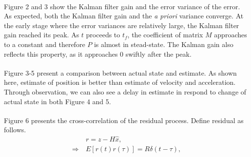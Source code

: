 \paragraph{}
Figure 2 and 3 show the Kalman filter gain and the error variance of the error. As expected, both the Kalman filter gain and the \textit{a priori} variance converge. At the early stage where the error variances are relatively large, the Kalman filter gain reached its peak. As $t$ proceeds to $t_f$, the coefficient of matrix $M$ approaches to a constant and therefore $P$ is almost in stead-state. The Kalman gain also reflects this property, as it approaches 0 swiftly after the peak. \vspace{-12pt}
\paragraph{}
Figure 3-5 present a comparison between actual state and estimate. As shown here, estimate of position is better than estimate of velocity and acceleration. Through observation, we can also see a delay in estimate in respond to change of actual state in both Figure 4 and 5.
\vspace{-12pt}
\paragraph{}
Figure 6 presents the cross-correlation of the residual process. Define residual as follows.
\begin{align*}
&r = z - H\hat{x}, \\
\Rightarrow \ &E[r(t)r(\tau)] = R\delta(t-\tau),
\end{align*}
